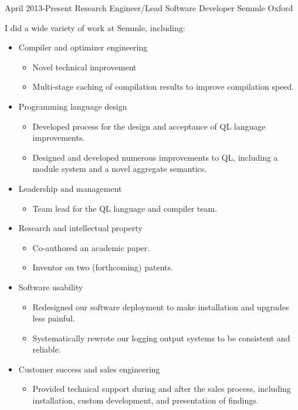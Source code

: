 \documentclass[12pt,a4paper,sans]{moderncv}
\begin{document}
\cventry
{April 2013-Present}
{Research Engineer/Lead Software Developer}
{Semmle}
{Oxford}
{}
{
  I did a wide variety of work at Semmle, including:
  \begin{itemize}
  \item Compiler and optimizer engineering
    \begin{itemize}
    \item Novel technical improvement
    \item Multi-stage caching of compilation results to improve compilation speed.
    \end{itemize}
  \item Programming language design
    \begin{itemize}
    \item Developed process for the design and acceptance of QL language improvements.
    \item Designed and developed numerous improvements to QL, including a module
      system and a novel aggregate semantics.
    \end{itemize}
  \item Leadership and management
    \begin{itemize}
    \item Team lead for the QL language and compiler team.
    \end{itemize}
  \item Research and intellectual property
    \begin{itemize}
    \item Co-authored an academic paper.
    \item Inventor on two (forthcoming) patents.
    \end{itemize}
  \item Software usability
    \begin{itemize}
    \item Redesigned our software deployment to make installation and
      upgrades less painful.
    \item Systematically rewrote our logging output systems to be consistent and reliable.
    \end{itemize}
  \item Customer success and sales engineering
    \begin{itemize}
    \item Provided technical support during and after the sales process, including
      installation, custom development, and presentation of findings.
    \end{itemize}
  \end{itemize}
}
\end{document}
